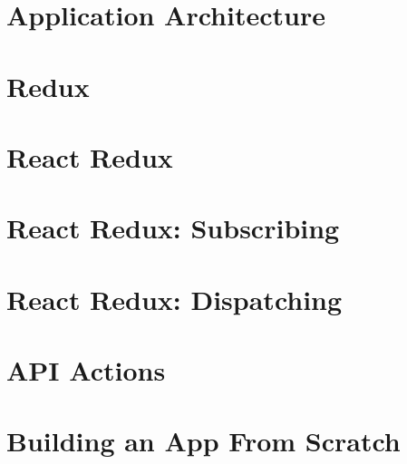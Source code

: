 \documentclass[b5paper,openany]{book}
\begin{document}
\tp


\tableofcontents



\chapter{Application Architecture}


\chapter{Redux}


\chapter{React Redux}


\chapter{React Redux: Subscribing}


\chapter{React Redux: Dispatching}


\chapter{API Actions}


\chapter{Building an App From Scratch}






\end{document}
